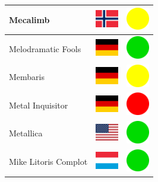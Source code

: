 \documentclass[12pt, a4paper, twoside]{report}
\begin{document}
\begin{center}
\begin{longtable}{|p{5cm}|p{2cm}|p{2cm}|}
Mecalimb & \includegraphics[width=1cm]{4x3/no} & \includegraphics[width=1cm]{likes/m} \\ \hline
Melodramatic Fools & \includegraphics[width=1cm]{4x3/de} & \includegraphics[width=1cm]{likes/y} \\ \hline
Membaris & \includegraphics[width=1cm]{4x3/de} & \includegraphics[width=1cm]{likes/m} \\ \hline
Metal Inquisitor & \includegraphics[width=1cm]{4x3/de} & \includegraphics[width=1cm]{likes/n} \\ \hline
Metallica & \includegraphics[width=1cm]{4x3/us} & \includegraphics[width=1cm]{likes/y} \\ \hline
Mike Litoris Complot & \includegraphics[width=1cm]{4x3/lu} & \includegraphics[width=1cm]{likes/y} \\ \hline

\end{longtable}
\end{center}
\end{document}

